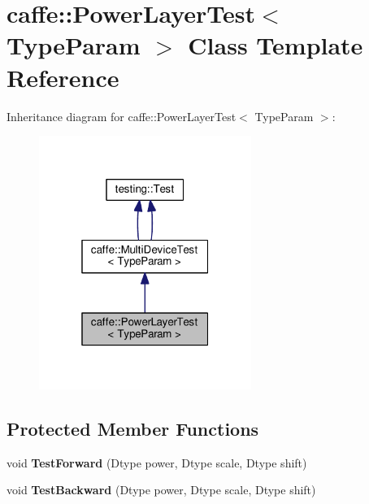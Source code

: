 \hypertarget{classcaffe_1_1_power_layer_test}{}\section{caffe\+:\+:Power\+Layer\+Test$<$ Type\+Param $>$ Class Template Reference}
\label{classcaffe_1_1_power_layer_test}


Inheritance diagram for caffe\+:\+:Power\+Layer\+Test$<$ Type\+Param $>$\+:
\nopagebreak
\begin{figure}[H]
\begin{center}
\leavevmode
\includegraphics[width=196pt]{classcaffe_1_1_power_layer_test__inherit__graph}
\end{center}
\end{figure}
\subsection*{Protected Member Functions}
\begin{DoxyCompactItemize}
\item 
\mbox{\label{classcaffe_1_1_power_layer_test_a5de640d7f3fc11a910224c7dd1f515f0}} 
void {\bfseries Test\+Forward} (Dtype power, Dtype scale, Dtype shift)
\item 
\mbox{\label{classcaffe_1_1_power_layer_test_a70987549d54b36bb639867f4333dce3d}} 
void {\bfseries Test\+Backward} (Dtype power, Dtype scale, Dtype shift)
\end{DoxyCompactItemize}
